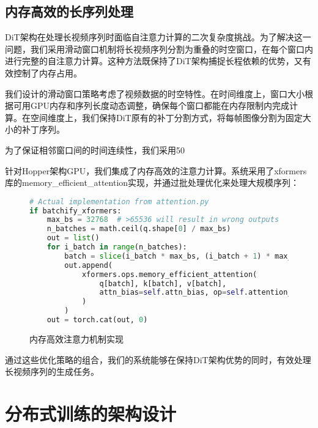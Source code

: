 \subsection{内存高效的长序列处理}

DiT架构在处理长视频序列时面临自注意力计算的二次复杂度挑战。为了解决这一问题，我们采用滑动窗口机制将长视频序列分割为重叠的时空窗口，在每个窗口内进行完整的自注意力计算。这种方法既保持了DiT架构捕捉长程依赖的优势，又有效控制了内存占用。

我们设计的滑动窗口策略考虑了视频数据的时空特性。在时间维度上，窗口大小根据可用GPU内存和序列长度动态调整，确保每个窗口都能在内存限制内完成计算。在空间维度上，我们保持DiT原有的补丁分割方式，将每帧图像分割为固定大小的补丁序列。

为了保证相邻窗口间的时间连续性，我们采用50%

针对Hopper架构GPU，我们集成了内存高效的注意力计算。系统采用了xformers库的memory\_efficient\_attention实现，并通过批处理优化来处理大规模序列：

\begin{figure}[!b]
  \begin{tmpbox}
    \begin{lstlisting}[language=Python]
# Actual implementation from attention.py
if batchify_xformers:
    max_bs = 32768  # >65536 will result in wrong outputs
    n_batches = math.ceil(q.shape[0] / max_bs)
    out = list()
    for i_batch in range(n_batches):
        batch = slice(i_batch * max_bs, (i_batch + 1) * max_bs)
        out.append(
            xformers.ops.memory_efficient_attention(
                q[batch], k[batch], v[batch],
                attn_bias=self.attn_bias, op=self.attention_op
            )
        )
    out = torch.cat(out, 0)
\end{lstlisting}
  \end{tmpbox}
  \caption{内存高效注意力机制实现}
  \label{fig:attention-code}
\end{figure}

通过这些优化策略的组合，我们的系统能够在保持DiT架构优势的同时，有效处理长视频序列的生成任务。

\section{分布式训练的架构设计}

